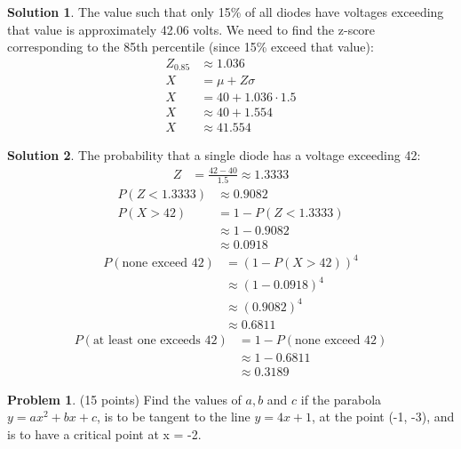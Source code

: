 \documentclass[11pt]{article}
\theoremstyle{definition}
\newtheorem{problem}{Problem}
\newtheorem*{solution}{Solution}
\begin{document}
\begin{solution}
    \item The value such that only 15\% of all diodes have voltages exceeding that value is approximately 42.06 volts.
    We need to find the z-score corresponding to the 85th percentile (since 15\% exceed that value):
    \begin{align}
        Z_{0.85} &\approx 1.036 \\
        X &= \mu + Z\sigma \\
        X &= 40 + 1.036 \cdot 1.5 \\
        X &\approx 40 + 1.554 \\
        X &\approx 41.554
    \end{align}
\end{solution}
\begin{solution}
    \item The probability that a single diode has a voltage exceeding 42:
    \begin{align}
        Z &= \frac{42 - 40}{1.5} \approx 1.3333
    \end{align}
    \begin{align}
        P(Z < 1.3333) &\approx 0.9082 \\
        P(X > 42) &= 1 - P(Z < 1.3333) \\
        &\approx 1 - 0.9082 \\
        &\approx 0.0918
    \end{align}
    \begin{align}
        P(\text{none exceed 42}) &= (1 - P(X > 42))^4 \\
        &\approx (1 - 0.0918)^4 \\
        &\approx (0.9082)^4 \\
        &\approx 0.6811
    \end{align}
    \begin{align}
        P(\text{at least one exceeds 42}) &= 1 - P(\text{none exceed 42}) \\
        &\approx 1 - 0.6811 \\
        &\approx 0.3189
    \end{align}
\end{solution}

\begin{problem}
(15 points) Find the values of $a,b$ and $c$ if the parabola $y=ax^2+bx+c$, is to be tangent to the line $y=4x+1$, at the point (-1, -3),
and is to have a critical point at x = -2.
\end{problem}
\end{document}
